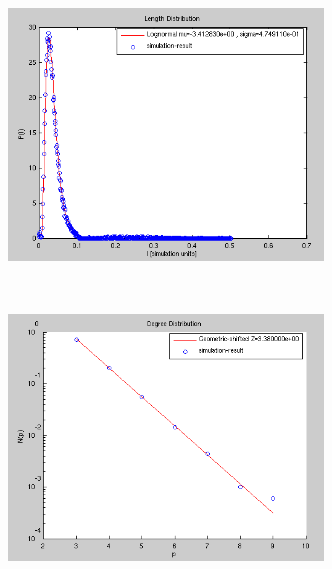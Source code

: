 \begin{figure}[h!]
  \centering
  \begin{subfigure}{0.7\textwidth}
    \centering
    \includegraphics[width=0.92\textwidth]{Figures/chapter-reconstruct/lengthN10000.png}%
    \label{collagen_length}
  \end{subfigure}\\[1ex]
  \begin{subfigure}{0.7\textwidth}
    \centering
    \includegraphics[width=0.92\textwidth]{Figures/chapter-reconstruct/degreeN10000.png}%
    \label{collagen_degree}
  \end{subfigure}\\[1ex]
  \begin{subfigure}{0.7\textwidth}
    \centering

\end{subfigure}
\end{figure}
